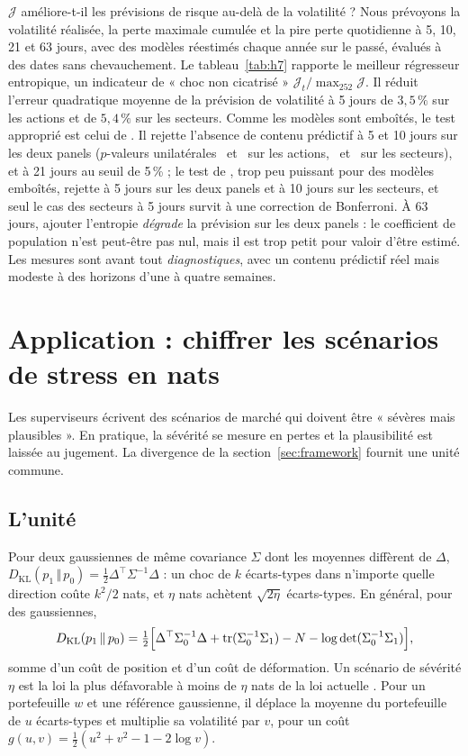 \documentclass[12pt]{article}
\theoremstyle{definition}
\newcommand{\JJ}{\mathcal{J}}
\newcommand{\KL}[2]{D_{\mathrm{KL}}\!\left(#1\,\Vert\,#2\right)}
\begin{document}
\begin{doublespace}
$\JJ$ améliore-t-il les prévisions de risque au-delà de la volatilité ? Nous
prévoyons la volatilité réalisée, la perte maximale cumulée et la pire perte
quotidienne à 5, 10, 21 et 63 jours, avec des modèles réestimés chaque année
sur le passé, évalués à des dates sans chevauchement. Le
tableau~\ref{tab:h7} rapporte le meilleur régresseur entropique, un
indicateur de « choc non cicatrisé » $\JJ_t/\max_{252}\JJ$. Il réduit
l'erreur quadratique moyenne de la prévision de volatilité à 5 jours de
$3{,}5\,\%$ sur les actions et de $5{,}4\,\%$ sur les secteurs. Comme les
modèles sont emboîtés, le test approprié est celui de \citet{clarkwest2007}.
Il rejette l'absence de contenu prédictif à 5 et 10 jours sur les deux panels
($p$-valeurs unilatérales \cwSpFive\ et \cwSpTen\ sur les actions,
\cwFfFive\ et \cwFfTen\ sur les secteurs), et à 21 jours au seuil de 5\,\% ;
le test de \citet{dm1995}, trop peu puissant pour des modèles emboîtés,
rejette à 5 jours sur les deux panels et à 10 jours sur les secteurs, et seul
le cas des secteurs à 5 jours survit à une correction de Bonferroni. À
63 jours, ajouter l'entropie \emph{dégrade} la prévision sur les deux panels :
le coefficient de population n'est peut-être pas nul, mais il est trop petit
pour valoir d'être estimé. Les mesures sont avant tout \emph{diagnostiques},
avec un contenu prédictif réel mais modeste à des horizons d'une à quatre
semaines.

\section{Application : chiffrer les scénarios de stress en nats}
\label{sec:stress}

Les superviseurs écrivent des scénarios de marché qui doivent être « sévères
mais plausibles ». En pratique, la sévérité se mesure en pertes et la
plausibilité est laissée au jugement. La divergence de la
section~\ref{sec:framework} fournit une unité commune.

\subsection{L'unité}

Pour deux gaussiennes de même covariance $\Sigma$ dont les moyennes diffèrent
de $\Delta$, $\KL{p_1}{p_0}=\tfrac12\Delta^\top\Sigma^{-1}\Delta$ : un choc de
$k$ écarts-types dans n'importe quelle direction coûte $k^2/2$ nats, et
$\eta$ nats achètent $\sqrt{2\eta}$ écarts-types. En général, pour des
gaussiennes,
\begin{equation}
\label{eq:klgauss}
\KL{p_1}{p_0}=\tfrac12\Bigl[\Delta^\top\Sigma_0^{-1}\Delta
+\mathrm{tr}(\Sigma_0^{-1}\Sigma_1)-N-\log\det(\Sigma_0^{-1}\Sigma_1)\Bigr],
\end{equation}
somme d'un coût de position et d'un coût de déformation. Un scénario de
sévérité $\eta$ est la loi la plus défavorable à moins de $\eta$ nats de la
loi actuelle \citep{breuer2013,glasserman2014}. Pour un portefeuille $w$ et
une référence gaussienne, il déplace la moyenne du portefeuille de $u$
écarts-types et multiplie sa volatilité par $v$, pour un coût
$g(u,v)=\tfrac12(u^2+v^2-1-2\log v)$.


\end{doublespace}
\end{document}
